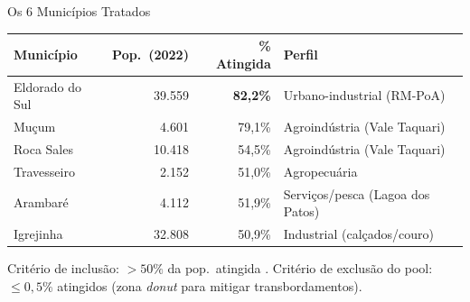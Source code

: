 \documentclass[11pt, aspectratio=169]{beamer}
\newcommand{\destaque}[1]{\textcolor{mred}{\textbf{#1}}}
\begin{document}
\begin{frame}{Os 6 Municípios Tratados}

\begin{center}
\footnotesize
\begin{tabular}{lrrl}
\toprule
Município & Pop.\ (2022) & \% Atingida & Perfil \\
\midrule
Eldorado do Sul & 39.559 & \destaque{82,2\%} & Urbano-industrial (RM-PoA) \\
Muçum           &  4.601 & 79,1\%            & Agroindústria (Vale Taquari) \\
Roca Sales      & 10.418 & 54,5\%            & Agroindústria (Vale Taquari) \\
Travesseiro     &  2.152 & 51,0\%            & Agropecuária \\
Arambaré        &  4.112 & 51,9\%            & Serviços/pesca (Lagoa dos Patos) \\
Igrejinha       & 32.808 & 50,9\%            & Industrial (calçados/couro) \\
\bottomrule
\end{tabular}
\end{center}

\medskip
\footnotesize
Critério de inclusão: $>50\%$ da pop.\ atingida \cite{teixeira2024}.
Critério de exclusão do pool: $\leq 0{,}5\%$ atingidos (zona \textit{donut} para mitigar transbordamentos).

\end{frame}
\end{document}
